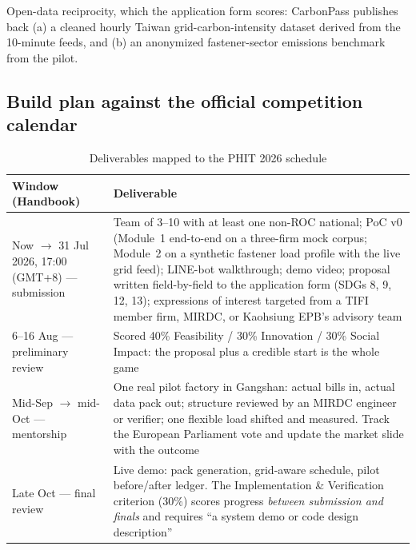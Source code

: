 Open-data reciprocity, which the application form scores: CarbonPass publishes
back (a) a cleaned hourly Taiwan grid-carbon-intensity dataset derived from the
10-minute feeds, and (b) an anonymized fastener-sector emissions benchmark from
the pilot.

\subsection{Build plan against the official competition calendar}

\begin{table}[htbp]
\caption{Deliverables mapped to the PHIT 2026 schedule\cite{handbook}}
\label{tab:plan}
\small
\begin{tabularx}{\textwidth}{@{}p{}X@{}}
\toprule
\textbf{Window (Handbook)} & \textbf{Deliverable} \\
\midrule
Now $\to$ 31 Jul 2026, 17:00 (GMT+8) --- submission & Team of 3--10 with at least one non-ROC national; PoC v0 (Module~1 end-to-end on a three-firm mock corpus; Module~2 on a synthetic fastener load profile with the live grid feed); LINE-bot walkthrough; demo video; proposal written field-by-field to the application form (SDGs 8, 9, 12, 13); expressions of interest targeted from a TIFI member firm, MIRDC, or Kaohsiung EPB's advisory team \\
6--16 Aug --- preliminary review & Scored 40\% Feasibility / 30\% Innovation / 30\% Social Impact: the proposal plus a credible start is the whole game \\
Mid-Sep $\to$ mid-Oct --- mentorship & One real pilot factory in Gangshan: actual bills in, actual data pack out; structure reviewed by an MIRDC engineer or verifier; one flexible load shifted and measured. Track the European Parliament vote and update the market slide with the outcome \\
Late Oct --- final review & Live demo: pack generation, grid-aware schedule, pilot before/after ledger. The Implementation \& Verification criterion (30\%) scores progress \emph{between submission and finals} and requires ``a system demo or code design description'' \\
\bottomrule
\end{tabularx}
\end{table}
